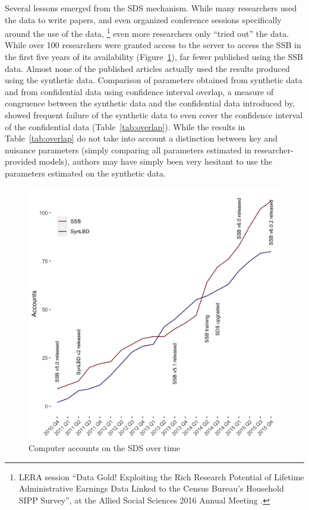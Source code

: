 \documentclass[]{hdsr}
\begin{document}
Several lessons emerged from the SDS mechanism. While many researchers used the data to write papers, and even organized conference sessions specifically around the use of the data,
%
\footnote{LERA session ``Data Gold! Exploiting the Rich Research Potential of Lifetime
Administrative Earnings Data Linked to the Census Bureau’s
Household SIPP Survey'',  at the Allied Social Sciences 2016 Annual Meeting \citep{american_economic_association_allied_2016}. }
%
even more researchers only ``tried out'' the data. While over 100 researchers were granted access to the server to access the SSB in the first five years of its availability (Figure~\ref{fig:growth_in_sds}), far fewer published using the SSB data. Almost none of the published articles actually used the results produced using the synthetic data. Comparison of parameters obtained from synthetic data and from confidential data using confidence interval overlap, a measure of congruence between the synthetic data and the confidential data introduced by\citet{tas2006}, showed frequent failure of the synthetic data to even cover the confidence interval of the  confidential data (Table~\ref{tab:overlap}). While the results in Table~\ref{tab:overlap} do not take into account a distinction between key and nuisance parameters (simply comparing all parameters estimated in researcher-provided models), authors may have simply been very hesitant to use the parameters estimated on the synthetic data.


\begin{figure}
    \centering
    \includegraphics[width=\textwidth]{figs/accounts-2015.png}
    \caption{Computer accounts on the SDS over time}
    \label{fig:growth_in_sds}
\end{figure}
\end{document}
